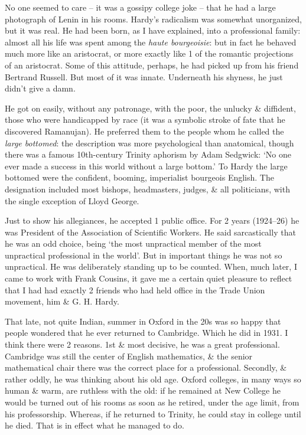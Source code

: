 \documentclass{article}
\numberwithin{equation}{section}
\begin{document}
No one seemed to care -- it was a gossipy college joke -- that he had a large photograph of Lenin in his rooms. Hardy's radicalism was somewhat unorganized, but it was real. He had been born, as I have explained, into a professional family: almost all his life was spent among the \textit{haute bourgeoisie}: but in fact he behaved much more like an aristocrat, or more exactly like 1 of the romantic projections of an aristocrat. Some of this attitude, perhaps, he had picked up from his friend Bertrand Russell. But most of it was innate. Underneath his shyness, he just didn't give a damn.

He got on easily, without any patronage, with the poor, the unlucky \& diffident, those who were handicapped by race (it was a symbolic stroke of fate that he discovered Ramanujan). He preferred them to the people whom he called the \textit{large bottomed}: the description was more psychological than anatomical, though there was a famous 10th-century Trinity aphorism by Adam Sedgwick: `No one ever made a success in this world without a large bottom.' To Hardy the large bottomed were the confident, booming, imperialist bourgeois English. The designation included most bishops, headmasters, judges, \& all politicians, with the single exception of Lloyd George.

Just to show his allegiances, he accepted 1 public office. For 2 years (1924--26) he was President of the Association of Scientific Workers. He said sarcastically that he was an odd choice, being `the most unpractical member of the most unpractical professional in the world'. But in important things he was not so unpractical. He was deliberately standing up to be counted. When, much later, I came to work with Frank Cousins, it gave me a certain quiet pleasure to reflect that I had had exactly 2 friends who had held office in the Trade Union movement, him \& G. H. Hardy.

That late, not quite Indian, summer in Oxford in the 20s was so happy that people wondered that he ever returned to Cambridge. Which he did in 1931. I think there were 2 reasons. 1st \& most decisive, he was a great professional. Cambridge was still the center of English mathematics, \& the senior mathematical chair there was the correct place for a professional. Secondly, \& rather oddly, he was thinking about his old age. Oxford colleges, in many ways so human \& warm, are ruthless with the old: if he remained at New College he would be turned out of his rooms as soon as he retired, under the age limit, from his professorship. Whereas, if he returned to Trinity, he could stay in college until he died. That is in effect what he managed to do.
\end{document}
